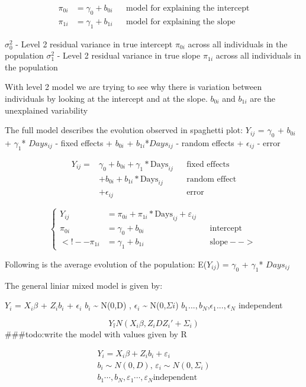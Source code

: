 \documentclass[
]{article}
\begin{document}
\[\begin{align}
π_{0i} &= γ_{0} + b_{0i} &&\text{model for explaining the intercept} \\
π_{1i} &= γ_{1} + b_{1i} &&\text{model for explaining the slope}
\end{align}\]

\(\sigma_{0}^{2}\) - Level 2 residual variance in true intercept
\(\pi_{0i}\) across all individuals in the population \(\sigma_{1}^{2}\)
- Level 2 residual variance in true slope \(\pi_{1i}\) across all
individuals in the population

With level 2 model we are trying to see why there is variation between
individuals by looking at the intercept and at the slope. \(b_{0i}\) and
\(b_{1i}\) are the unexplained variability

The full model describes the evolution observed in spaghetti plot:
\(Y_{ij}\) = \(\gamma_{0}\) + \(b_{0i}\) + \(\gamma_{1}\)* \(Days_{ij}\)
- fixed effects + \(b_{0i}\) + \(b_{1i}\)*\(Days_{ij}\) - random effects
+ \(\epsilon_{ij}\) - error

\[\begin{align}
Y_{ij} =& γ_{0} + b_{0i} + γ_{1}* \text{Days}_{ij} &&\text{fixed effects}\\
          &+ b_{0i} + b_{1i}*\text{Days}_{ij} &&\text{random effect}\\
          &+ \epsilon_{ij} &&\text{error}
\end{align}\]

\[
\begin{cases}
Y_{ij}&= π_{0i} + π_{1i}* \text{Days}_{ij} + ε_{ij} \\
π_{0i} &= γ_{0} + b_{0i} &&\text{intercept} \\
<!-- π_{1i} &= γ_{1} + b_{1i} &&\text{slope} -->
\end{cases}
\]

Following is the average evolution of the population: E(\(Y_{ij}\)) =
\(\gamma_{0}\) + \(\gamma_{1}\)* \(Days_{ij}\)

The general liniar mixed model is given by:

\(Y_{i}\) = \(X_{i}\beta\) + \(Z_{i}b_{i}\) + \(\epsilon_{i}\) \(b_{i}\)
\textasciitilde{} N(0,D) , \(\epsilon_{i}\) \textasciitilde{}
N(0,\(\Sigma{i}\)) \(b_{ 1}...,b_{N}\),\(\epsilon_{1}...,\epsilon_{N}\)
independent

\[Y_i \tilde{} N(X_i\beta, Z_iDZ_i'+\Sigma_i)\] \#\#\#todo:write the
model with values given by R

\[\begin{align}
Y_i = X_i\beta + Z_i b_i + ε_i \\ 
b_i \sim N(0,D)\text{, }ε_i \sim N(0,Σ_i) \\ 
b_1\cdots,b_N, ε_1\cdots,ε_N \text{independent}
\end{align}\]
\end{document}
